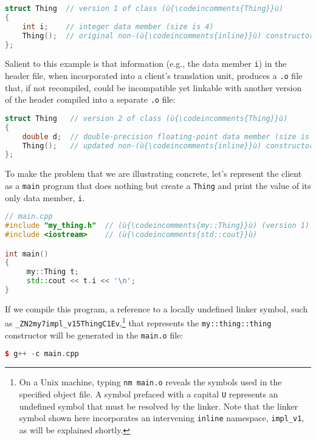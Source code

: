 \begin{lstlisting}[language=C++]
struct Thing  // version 1 of class (ù{\codeincomments{Thing}}ù)
{
    int i;    // integer data member (size is 4)
    Thing();  // original non-(ù{\codeincomments{inline}}ù) constructor (defined in (ù{\codeincomments{.cpp}}ù) file)
};
\end{lstlisting}
    
\noindent Salient to this example is that information (e.g., the data member
\texttt{i}) in the header file, when incorporated into a client's
translation unit, produces a \texttt{.o} file that, if not recompiled,
could be incompatible yet linkable with another version of the header
compiled into a separate \texttt{.o} file:

\begin{lstlisting}[language=C++]
struct Thing   // version 2 of class (ù{\codeincomments{Thing}}ù)
{
    double d;  // double-precision floating-point data member (size is 8)
    Thing();   // updated non-(ù{\codeincomments{inline}}ù) constructor (defined in (ù{\codeincomments{.cpp}}ù) file)
};
\end{lstlisting}
    
\noindent To make the problem that we are illustrating concrete, let's represent
the client as a \texttt{main} program that does nothing but create a
\texttt{Thing} and print the value of its only data member, \texttt{i}.

\begin{lstlisting}[language=C++]
// main.cpp
#include "my_thing.h"  // (ù{\codeincomments{my::Thing}}ù) (version 1)
#include <iostream>    // (ù{\codeincomments{std::cout}}ù)

int main()
{
     my::Thing t;
     std::cout << t.i << '\n';
}
\end{lstlisting}
    
\noindent If we compile this program, a reference to a locally undefined linker
symbol, such as
\texttt{\_ZN2my7impl\_v15ThingC1Ev},{\cprotect\footnote{On a Unix
machine, typing \texttt{nm}~\texttt{main.o} reveals the symbols used
in the specified object file. A symbol prefaced with a capital
\texttt{U} represents an undefined symbol that must be resolved by the
linker. Note that the linker symbol shown here incorporates an
intervening \texttt{inline} namespace, \texttt{impl\_v1}, as will be
  explained shortly.}} that represents the \texttt{my::thing::thing}
constructor will be generated in the \texttt{main.o} file:

\begin{lstlisting}[language=C++]
$ g++ -c main.cpp
\end{lstlisting}
    
